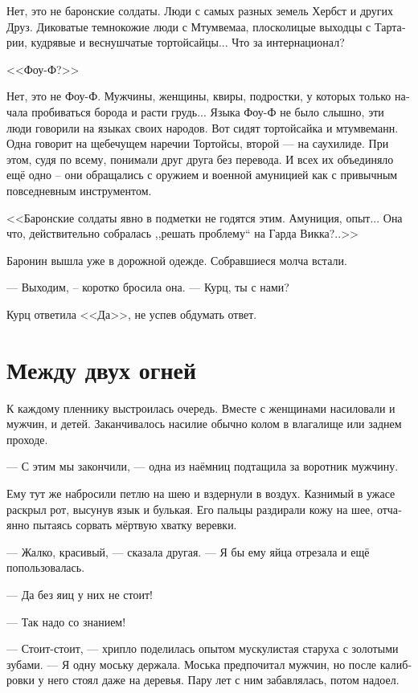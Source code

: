 \documentclass[a4paper,12pt,fleqn]{book}\usepackage{cooltooltips}\usepackage{polyglossia}\setdefaultlanguage[babelshorthands=true]{russian}\setotherlanguage{english}\defaultfontfeatures{Ligatures=TeX,Mapping=tex-text} \usepackage{xcolor}\definecolor{lightgray}{HTML}{bbbbbb}\color{lightgray}\newcommand{\ml}[3]{\textenglish{\textcolor{black}{#3}}}
\begin{document}
Нет, это не баронские солдаты.
Люди с самых разных земель Хербст и других Друз.
Диковатые темнокожие люди с Мтумвемаа, плосколицые выходцы с Тартарии, кудрявые и веснушчатые тортойсайцы...
Что за интернационал?

<<Фоу-Ф?>>

Нет, это не Фоу-Ф.
Мужчины, женщины, квиры, подростки, у которых только начала пробиваться борода и расти грудь...
Языка Фоу-Ф не было слышно, эти люди говорили на языках своих народов.
Вот сидят тортойсайка и мтумвеманн.
Одна говорит на щебечущем наречии Тортойсы, второй --- на саухилиде.
При этом, судя по всему, понимали друг друга без перевода.
И всех их объединяло ещё одно -- они обращались с оружием и военной амуницией как с привычным повседневным инструментом.

<<Баронские солдаты явно в подметки не годятся этим.
Амуниция, опыт...
Она что, действительно собралась ,,решать проблему`` на Гарда Викка?..>>

Баронин вышла уже в дорожной одежде.
Собравшиеся молча встали.

--- Выходим, -- коротко бросила она.
--- Курц, ты с нами?

Курц ответила <<Да>>, не успев обдумать ответ.

\section{Между двух огней}

К каждому пленнику выстроилась очередь.
Вместе с женщинами насиловали и мужчин, и детей.
Заканчивалось насилие обычно колом в влагалище или заднем проходе.

--- С этим мы закончили, --- одна из наёмниц подтащила за воротник мужчину.

Ему тут же набросили петлю на шею и вздернули в воздух.
Казнимый в ужасе раскрыл рот, высунув язык и булькая.
Его пальцы раздирали кожу на шее, отчаянно пытаясь сорвать мёртвую хватку веревки.

--- Жалко, красивый, --- сказала другая.
--- Я бы ему яйца отрезала и ещё попользовалась.

--- Да без яиц у них не стоит!

--- Так надо со знанием!

--- Стоит-стоит, --- хрипло поделилась опытом мускулистая старуха с золотыми зубами.
--- Я одну моську держала.
Моська предпочитал мужчин, но после калибровки у него стоял даже на деревья.
Пару лет с ним забавлялась, потом надоел.
\end{document}
